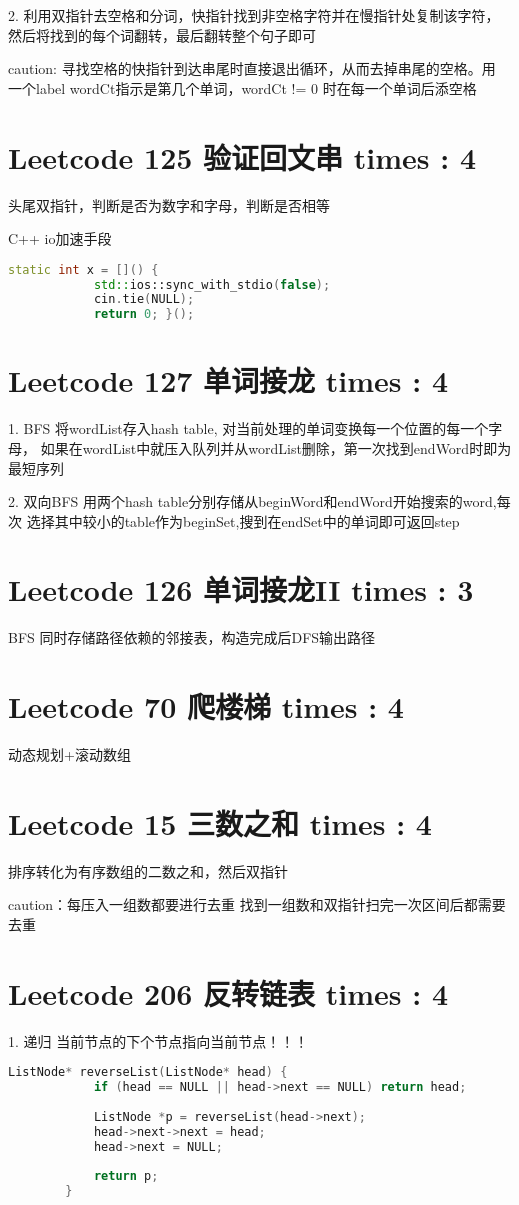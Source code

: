 \documentclass[UTF8]{ctexart}
\begin{document}
2. 利用双指针去空格和分词，快指针找到非空格字符并在慢指针处复制该字符，
然后将找到的每个词翻转，最后翻转整个句子即可

caution: 寻找空格的快指针到达串尾时直接退出循环，从而去掉串尾的空格。用
一个label wordCt指示是第几个单词，wordCt != 0 时在每一个单词后添空格

\section{Leetcode 125 验证回文串 times : 4}
头尾双指针，判断是否为数字和字母，判断是否相等

C++ io加速手段
\begin{framed}
	\begin{lstlisting}[language=C++]
		static int x = []() {
			std::ios::sync_with_stdio(false);
			cin.tie(NULL);
			return 0; }();
	\end{lstlisting}
\end{framed}

\section{Leetcode 127 单词接龙 times : 4}
1. BFS 将wordList存入hash table, 对当前处理的单词变换每一个位置的每一个字母，
如果在wordList中就压入队列并从wordList删除，第一次找到endWord时即为最短序列

2. 双向BFS 用两个hash table分别存储从beginWord和endWord开始搜索的word,每次
选择其中较小的table作为beginSet,搜到在endSet中的单词即可返回step

\section{Leetcode 126 单词接龙II times : 3}
BFS 同时存储路径依赖的邻接表，构造完成后DFS输出路径

\section{Leetcode 70 爬楼梯 times : 4}
动态规划+滚动数组

\section{Leetcode 15 三数之和 times : 4}
排序转化为有序数组的二数之和，然后双指针


caution：每压入一组数都要进行去重
找到一组数和双指针扫完一次区间后都需要去重

\section{Leetcode 206 反转链表 times : 4}
1. 递归 当前节点的下个节点指向当前节点！！！
\begin{framed}
	\begin{lstlisting}[language=C++]
		ListNode* reverseList(ListNode* head) {
			if (head == NULL || head->next == NULL) return head;
	
			ListNode *p = reverseList(head->next);
			head->next->next = head;
			head->next = NULL;
	
			return p;
		}
	\end{lstlisting}
\end{framed}
\end{document}
